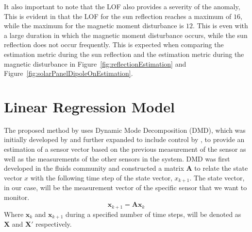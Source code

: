It also important to note that the LOF also provides a severity of the anomaly, This is evident in that the LOF for the sun reflection reaches a maximum of $16$, while the maximum for the magnetic moment disturbance is $12$. This is even with a large duration in which the magnetic moment disturbance occurs, while the sun reflection does not occur frequently. This is expected when comparing the estimation metric during the sun reflection and the estimation metric during the magnetic disturbance in Figure~\ref{fig:reflectionEstimation} and Figure~\ref{fig:solarPanelDipoleOnEstimation}.


\section{Linear Regression Model}
The proposed method by \cite{DeSilva2020} uses Dynamic Mode Decomposition (DMD), which was initially developed by \cite{schmid2011applications} and further expanded to include control by \cite{proctor2016dynamic}, to provide an estimation of a sensor vector based on the previous measurement of the sensor as well as the measurements of the other sensors in the system. DMD was first developed in the fluids community and constructed a matrix $\mathbf{A}$ to relate the state vector $x$ with the following time step of the state vector, $x_{k+1}$. The state vector, in our case, will be the measurement vector of the specific sensor that we want to monitor.
\begin{equation}
	\mathbf{x}_{k+1} = \mathbf{Ax}_k
\end{equation}
Where $\mathbf{x}_k$ and $\mathbf{x}_{k+1}$ during a specified number of time steps, will be denoted as $\mathbf{X}$ and $\mathbf{X'}$ respectively.

